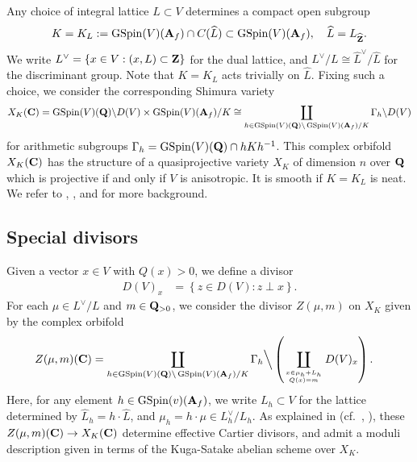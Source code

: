\documentclass{amsart}
\theoremstyle{definition}
\theoremstyle{definition}
\theoremstyle{definition}
\begin{document}
Any choice of integral lattice $L \subset V$ determines a compact open subgroup 
\begin{align*} K = K_L := \operatorname{GSpin}(V)({\bf{A}}_f) \cap C(\widehat{L}) \subset \operatorname{GSpin}(V)({\bf{A}}_f),
\quad \widehat{L} = L_{\widehat{\bf{Z}}}. \end{align*}
We write $L^{\vee} = \lbrace x \in V: (x, L) \subset {\bf{Z}} \rbrace$ for the dual lattice, and $L^{\vee}/L \cong \widehat{L}^{\vee}/ \widehat{L}$ for the discriminant group. 
Note that $K = K_L$ acts trivially on $\widehat{L}$. Fixing such a choice, we consider the corresponding Shimura variety 
\begin{align}\label{complexpoints} X_K({\bf{C}}) = \operatorname{GSpin}(V)({\bf{Q}}) \backslash D(V) \times \operatorname{GSpin}(V)({\bf{A}}_f) /K
\cong \coprod\limits_{ h \in \operatorname{GSpin}(V)({\bf{Q}}) \backslash \operatorname{GSpin}(V)({\bf{A}}_f) /K } \Gamma_h \backslash D(V) \end{align}
for arithmetic subgroups $\Gamma_h = \operatorname{GSpin}(V)({\bf{Q}}) \cap h K h^{-1}$. This complex orbifold $X_K({\bf{C}})$ has the structure of a 
quasiprojective variety $X_K$ of dimension $n$ over ${\bf{Q}}$ which is projective if and only if $V$ is anisotropic. It is smooth if $K = K_L$ is neat. 
We refer to \cite[$\S$2]{AGHMP}, \cite{KuAC}, and \cite[$\S$1]{KuBF} for more background.
 
\subsection{Special divisors}

Given a vector $x \in V$ with $Q(x) >0$, we define a divisor
\begin{align*} D(V)_x &= \left\lbrace z \in D(V) : z \perp x \right\rbrace. \end{align*}
For each $\mu \in L^{\vee}/L$ and $m \in {\bf{Q}}_{>0}$, we consider the divisor $Z(\mu, m)$ on $X_K$ given by the complex orbifold 
\begin{align}\label{special} Z(\mu, m)({\bf{C}}) &= 
\coprod\limits_{ h \in \operatorname{GSpin}(V)({\bf{Q}}) \backslash \operatorname{GSpin}(V)({\bf{A}}_f) /K } \Gamma_h \Big\backslash
\left(  \coprod\limits_{ x \in \mu_h + L_h \atop Q(x) = m } D(V)_x \right). \end{align}
Here, for any element $h \in \operatorname{GSpin}(v)({\bf{A}}_f)$, we write $L_h \subset V$
for the lattice determined by $\widehat{L}_h = h \cdot \widehat{L}$, and $\mu_h = h \cdot \mu \in L_h^{\vee}/L_h$.
As explained in \cite[$\S2$]{AGHMP} (cf.~\cite{KuAC}, \cite[$\S$1]{KuBF}), these $Z(\mu, m)({\bf{C}}) \rightarrow X_K ( { \bf{C} } )$ 
determine effective Cartier divisors, and admit a moduli description given in terms of the Kuga-Satake abelian scheme over $X_K$. 
\end{document}
